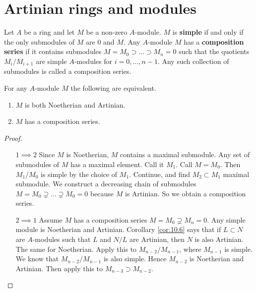\pagebreak

\section{Artinian rings and modules}


\begin{definition}
Let $ A $ be a ring and let $ M $ be a non-zero $ A $-module. $ M $ is \textbf{simple} if and only if the only submodules of $ M $ are $ 0 $ and $ M $. Any $ A $-module $ M $ has a \textbf{composition series} if it contains submodules $ M = M_0 \supset \dots \supset M_n = 0 $ such that the quotients $ M_i / M_{i + 1} $ are simple $ A $-modules for $ i = 0, \dots, n - 1 $. Any such collection of submodules is called a composition series.
\end{definition}

\begin{proposition}
For any $ A $-module $ M $ the following are equivalent.
\begin{enumerate}
\item $ M $ is both Noetherian and Artinian.
\item $ M $ has a composition series.
\end{enumerate}
\end{proposition}

\begin{proof}
\hfill
\begin{itemize}[leftmargin=0.5in]
\item[$ 1 \implies 2 $] Since $ M $ is Noetherian, $ M $ contains a maximal submodule. Any set of submodules of $ M $ has a maximal element. Call it $ M_1 $. Call $ M = M_0 $. Then $ M_1 / M_0 $ is simple by the choice of $ M_1 $. Continue, and find $ M_2 \subset M_1 $ maximal submodule. We construct a decreasing chain of submodules $ M = M_0 \supsetneq \dots \supsetneq M_0 = 0 $ because $ M $ is Artinian. So we obtain a composition series.
\item[$ 2 \implies 1 $] Assume $ M $ has a composition series $ M = M_0 \supsetneq M_n = 0 $. Any simple module is Noetherian and Artinian. Corollary \ref{cor:10.6} says that if $ L \subset N $ are $ A $-modules such that $ L $ and $ N / L $ are Artinian, then $ N $ is also Artinian. The same for Noetherian. Apply this to $ M_{n - 2} / M_{n - 1} $, where $ M_{n - 1} $ is simple. We know that $ M_{n - 2} / M_{n - 1} $ is also simple. Hence $ M_{n - 2} $ is Noetherian and Artinian. Then apply this to $ M_{n - 3} \supset M_{n - 2} $.
\end{itemize}
\end{proof}

